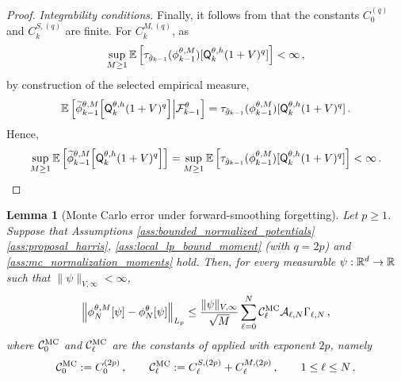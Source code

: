 \documentclass[11pt]{article}
\theoremstyle{plain}
\newtheorem{lemma}[theorem]{Lemma}
\theoremstyle{definition}
\theoremstyle{remark}
\begin{document}
\begin{proof}
\noindent\emph{Integrability conditions.} Finally, it follows from  that the constants $C_0^{(q)}$ and $C_k^{S,(q)}$ are finite. For $C_k^{M,(q)}$, as
$$
\sup_{M\ge1} \E\left[ \tau_{\approxpot{k-1}}(\mcfilter{k-1}) [ \mk{k}[\theta,h](1+V)^q ] \right] < \infty \eqsp,
$$
by construction of the selected empirical measure,
$$
\E\left[ \tildemcfilter{k-1}[\mk{k}[\theta,h](1+V)^q]\middle|\mathcal F_{k-1}^{\theta}\right]=\tau_{\approxpot{k-1}}(\mcfilter{k-1})[
\mk{k}[\theta,h](1+V)^q] \eqsp.
$$
Hence, 
$$
\sup_{M\ge1} \E\left[ \tildemcfilter{k-1}[\mk{k}[\theta,h](1+V)^q]\right]=\sup_{M\ge1}\E\left[\tau_{\approxpot{k-1}}(\mcfilter{k-1})[ \mk{k}[\theta,h](1+V)^q]\right]< \infty \eqsp.
$$
\end{proof}


\begin{lemma}[Monte Carlo error under forward-smoothing forgetting]
\label{thm:final_smc_error_bound}
Let $p\ge1$. Suppose that Assumptions \ref{ass:bounded_normalized_potentials} \ref{ass:proposal_harris}, \ref{ass:local_lp_bound_moment} (with $q=2p$) and \ref{ass:mc_normalization_moments}  hold. Then, for every measurable $\psi:\mathbb{R}^d\to\mathbb{R}$ such that
$\|\psi\|_{V,\infty}<\infty$,
$$
\normEc{ \mcfilter{N}[\psi]-\approxfilter{N}[\psi] }_{L_p} \le \frac{\|\psi\|_{V,\infty}}{\sqrt M} \sum_{\ell=0}^{N} \mathcal{C}_\ell^{\rm MC} \mathcal A_{\ell,N} \Gamma_{\ell,N} \eqsp,
$$
where $\mathcal{C}_0^{\rm MC}$ and $\mathcal{C}_\ell^{\rm MC}$ are the constants of
 applied with exponent $2p$, namely
$$
\mathcal{C}_0^{\rm MC}:= C_0^{(2p)} \,,
\qquad
\mathcal{C}_\ell^{\rm MC}:= C_\ell^{S,(2p)}+C_\ell^{M,(2p)} \,, 
\qquad 1\le \ell\le N \,.
$$
\end{lemma}
\end{document}
